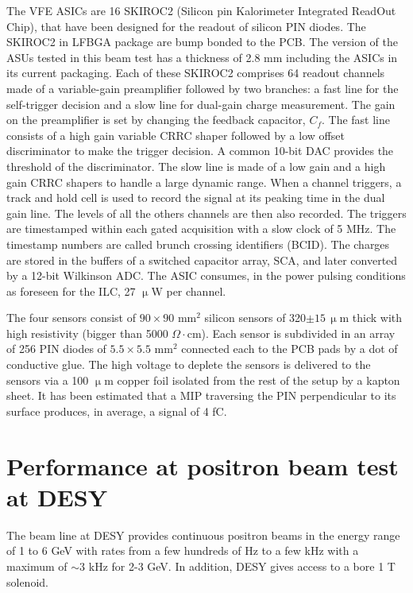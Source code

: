 \documentclass[final,3p,times,twocolumn]{elsarticle}
\begin{document}
The VFE ASICs are 16 SKIROC2 \cite{Callier:2011zz,Amjad:2014tha,Suehara:2018mqk}
(Silicon pin Kalorimeter Integrated ReadOut Chip), 
that have been designed for the readout of silicon PIN diodes.
The SKIROC2 in LFBGA package are bump bonded to the PCB.
The version of the ASUs tested in this beam test has a thickness
of 2.8 mm including the ASICs in its current packaging.
Each of these SKIROC2 comprises 64 readout channels
made of a variable-gain preamplifier followed by two branches:
a fast line for the self-trigger decision and a slow line for dual-gain charge measurement.
The gain on the preamplifier is set by changing the feedback capacitor, $C_{f}$.
The fast line consists of a high gain variable CRRC shaper followed by
a low offset discriminator to make the trigger decision.
A common 10-bit DAC provides the threshold of the discriminator.
The slow line is made of a low gain and a high gain CRRC
shapers to handle a large dynamic range.
When a channel triggers, a track and hold cell is used to record the signal at its peaking time
in the dual gain line. The levels of all the others
channels are then also recorded.
The triggers are timestamped within each gated acquisition with a slow clock
of 5 MHz. The timestamp numbers are called brunch crossing identifiers (BCID).
The charges are stored in the buffers of a switched capacitor array, SCA, and later converted by a 12-bit Wilkinson ADC.
The ASIC consumes, in the power pulsing conditions as foreseen for the ILC, 
27 $\upmu$W per channel.

The four sensors consist of $90\times90$ mm$^{2}$ silicon sensors of
320$\pm15\,\upmu$m thick with high resistivity (bigger than 5000 $\Omega\cdot$cm).
Each sensor is subdivided in an array of 256 PIN diodes of $5.5\times5.5$ mm$^2$
connected each to the PCB pads by a dot of conductive glue.
The high voltage to deplete the sensors is delivered to the sensors via a
100 $\upmu$m copper foil isolated from the rest of the setup by a kapton sheet.
It has been estimated that
a MIP traversing the PIN perpendicular to its surface produces, in average,
a signal of 4 fC.


\section{Performance at positron beam test at DESY}
\label{sec:beamtest}

The beam line at DESY provides continuous positron beams in the energy range of 1 to 6 GeV with
rates from a few hundreds of Hz to a few kHz with a maximum of $\sim 3$ kHz for 2-3 GeV. 
In addition, DESY gives access to a bore 1 T solenoid.
\end{document}
